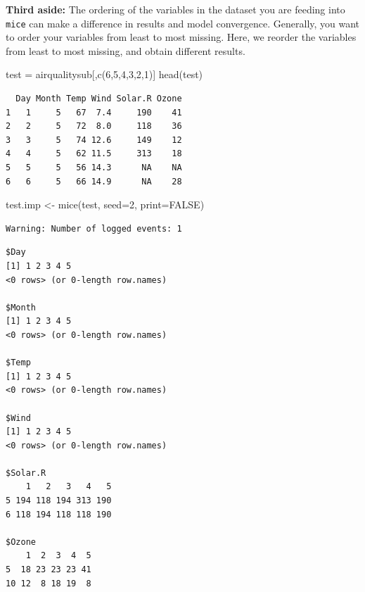 \documentclass[
  letterpaper,
  DIV=11,
  numbers=noendperiod]{scrreprt}
\newenvironment{Shaded}{\begin{snugshade}}{\end{snugshade}}
\newcommand{\AttributeTok}[1]{\textcolor[rgb]{0.49,0.56,0.16}{#1}}
\newcommand{\ConstantTok}[1]{\textcolor[rgb]{0.53,0.00,0.00}{#1}}
\newcommand{\DecValTok}[1]{\textcolor[rgb]{0.25,0.63,0.44}{#1}}
\newcommand{\FunctionTok}[1]{\textcolor[rgb]{0.02,0.16,0.49}{#1}}
\newcommand{\NormalTok}[1]{\textcolor[rgb]{0.00,0.44,0.13}{#1}}
\newcommand{\OtherTok}[1]{\textcolor[rgb]{0.00,0.44,0.13}{#1}}
\newcommand{\SpecialCharTok}[1]{\textcolor[rgb]{0.25,0.44,0.63}{#1}}
\begin{document}
\textbf{Third aside:} The ordering of the variables in the dataset you
are feeding into \texttt{mice} can make a difference in results and
model convergence. Generally, you want to order your variables from
least to most missing. Here, we reorder the variables from least to most
missing, and obtain different results.

\begin{Shaded}
\begin{Highlighting}[]
\NormalTok{  test }\OtherTok{=}\NormalTok{ airqualitysub[,}\FunctionTok{c}\NormalTok{(}\DecValTok{6}\NormalTok{,}\DecValTok{5}\NormalTok{,}\DecValTok{4}\NormalTok{,}\DecValTok{3}\NormalTok{,}\DecValTok{2}\NormalTok{,}\DecValTok{1}\NormalTok{)]}
  \FunctionTok{head}\NormalTok{(test)}
\end{Highlighting}
\end{Shaded}

\begin{verbatim}
  Day Month Temp Wind Solar.R Ozone
1   1     5   67  7.4     190    41
2   2     5   72  8.0     118    36
3   3     5   74 12.6     149    12
4   4     5   62 11.5     313    18
5   5     5   56 14.3      NA    NA
6   6     5   66 14.9      NA    28
\end{verbatim}

\begin{Shaded}
\begin{Highlighting}[]
\NormalTok{  test.imp }\OtherTok{\textless{}{-}} \FunctionTok{mice}\NormalTok{(test, }\AttributeTok{seed=}\DecValTok{2}\NormalTok{, }\AttributeTok{print=}\ConstantTok{FALSE}\NormalTok{)}
\end{Highlighting}
\end{Shaded}

\begin{verbatim}
Warning: Number of logged events: 1
\end{verbatim}

\begin{Shaded}
\end{Shaded}

\begin{verbatim}
$Day
[1] 1 2 3 4 5
<0 rows> (or 0-length row.names)

$Month
[1] 1 2 3 4 5
<0 rows> (or 0-length row.names)

$Temp
[1] 1 2 3 4 5
<0 rows> (or 0-length row.names)

$Wind
[1] 1 2 3 4 5
<0 rows> (or 0-length row.names)

$Solar.R
    1   2   3   4   5
5 194 118 194 313 190
6 118 194 118 118 190

$Ozone
    1  2  3  4  5
5  18 23 23 23 41
10 12  8 18 19  8
\end{verbatim}
\end{document}
